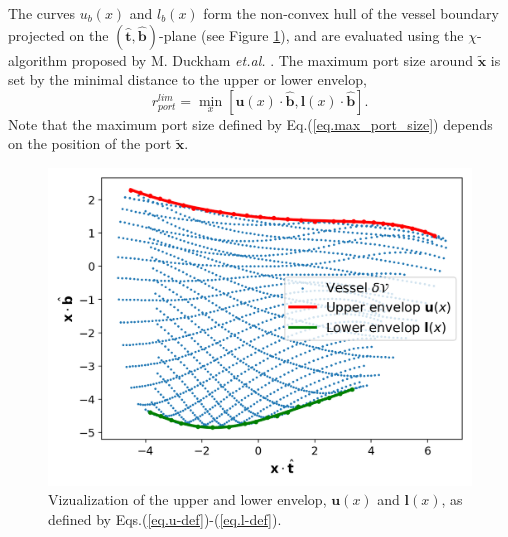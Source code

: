 \documentclass[12pt]{article}
\begin{document}
The curves $u_b(x)$ and $l_b(x)$ form the non-convex hull of the vessel boundary projected on the $(\hat{\mathbf{t}}, \hat{\mathbf{b}})$-plane (see Figure \ref{fig.non-convex-hull}), and are evaluated using the $\chi$-algorithm proposed by M. Duckham \textit{et.al.} \cite{duckham_2008}. The maximum port size around $\tilde{\mathbf{x}}$ is set by the minimal distance to the upper or lower envelop,
\begin{equation}
    r^{lim}_{port} = \min_{x}[\mathbf{u}(x)\cdot\hat{\mathbf{b}},\mathbf{l}(x)\cdot\hat{\mathbf{b}}]. \label{eq.max_port_size}
\end{equation}
Note that the maximum port size defined by Eq.(\ref{eq.max_port_size}) depends on the position of the port $\tilde{\mathbf{x}}$.

\begin{figure}
    \centering
    \includegraphics[width=.75\linewidth]{figures/envelop_vizualization.png}
    \caption{Vizualization of the upper and lower envelop, $\mathbf{u}(x)$ and $\mathbf{l}(x)$, as defined by Eqs.(\ref{eq.u-def})-(\ref{eq.l-def}).}
    \label{fig.non-convex-hull}
\end{figure}





\end{document}
